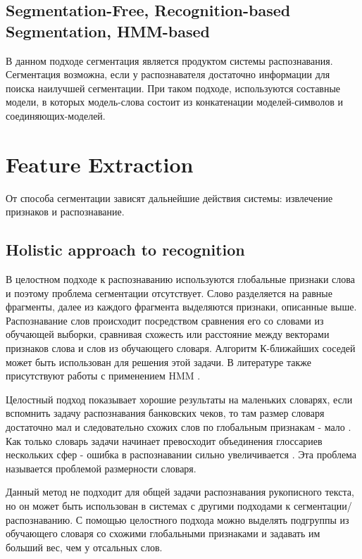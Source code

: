 \subsection{Segmentation-Free, Recognition-based Segmentation, HMM-based} \label{subsect5_1_2}

В данном подходе сегментация является продуктом системы распознавания. Сегментация возможна, если у распознавателя достаточно информации для поиска наилучшей сегментации. При таком подходе, используются составные модели, в которых модель-слова состоит из конкатенации моделей-символов и соединяющих-моделей. 


\section{Feature Extraction} \label{sect5_2}

От способа сегментации зависят дальнейшие действия системы: извлечение признаков и распознавание.


\subsection{Holistic approach to recognition} \label{subsect5_2_1}

В целостном подходе к распознаванию используются глобальные признаки слова и поэтому проблема сегментации отсутствует. Слово разделяется на равные фрагменты, далее из каждого фрагмента выделяются признаки, описанные выше. Распознавание слов происходит посредством сравнения его со словами из обучающей выборки, сравнивая схожесть или расстояние между векторами признаков слова и слов из обучающего словаря. Алгоритм К-ближайших соседей может быть использован для решения этой задачи. В литературе также присутствуют работы с применением HMM \cite{lavrenko2004holistic}.

Целостный подход показывает хорошие результаты на маленьких словарях, если вспомнить задачу распознавания банковских чеков, то там размер словаря достаточно мал и следовательно схожих слов по глобальным признакам - мало \cite{guillevic1995unconstrained} . Как только словарь задачи начинает превосходит объединения глоссариев нескольких сфер - ошибка в распознавании сильно увеличивается \cite{rehman2012off}. Эта проблема называется проблемой размерности словаря.

Данный метод не подходит для общей задачи распознавания рукописного текста, но он может быть использован в системах с другими подходами к сегментации/распознаванию. С помощью целостного подхода можно выделять подгруппы из обучающего словаря со схожими глобальными признаками и задавать им больший вес, чем у отсальных слов.


